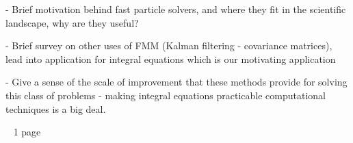 - Brief motivation behind fast particle solvers, and where they fit in the scientific landscape, why are they useful?

- Brief survey on other uses of FMM (Kalman filtering - covariance matrices), lead into application for integral equations which is our motivating application

- Give a sense of the scale of improvement that these methods provide for solving this class of problems - making integral equations practicable computational techniques is a big deal.

~ 1 page 